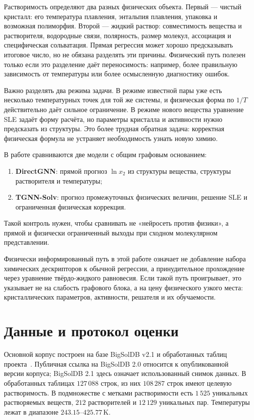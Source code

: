 \documentclass[11pt]{article}
\theoremstyle{definition}
\begin{document}
Растворимость определяют два разных физических объекта. Первый --- чистый кристалл: его температура плавления, энтальпия плавления, упаковка и возможная полиморфия. Второй --- жидкий раствор: совместимость вещества и растворителя, водородные связи, полярность, размер молекул, ассоциация и специфическая сольватация. Прямая регрессия может хорошо предсказывать итоговое число, но не обязана разделять эти причины. Физический путь полезен только если это разделение даёт переносимость: например, более правильную зависимость от температуры или более осмысленную диагностику ошибок.

Важно разделять два режима задачи. В режиме известной пары уже есть несколько температурных точек для той же системы, и физическая форма по $1/T$ действительно даёт сильное ограничение. В режиме нового вещества уравнение SLE задаёт форму расчёта, но параметры кристалла и активности нужно предсказать из структуры. Это более трудная обратная задача: корректная физическая формула не устраняет необходимость узнать новую химию.

В работе сравниваются две модели с общим графовым основанием:
\begin{enumerate}
    \item \textbf{DirectGNN}: прямой прогноз $\ln x_2$ из структуры вещества, структуры растворителя и температуры;
    \item \textbf{TGNN-Solv}: прогноз промежуточных физических величин, решение SLE и ограниченная физическая коррекция.
\end{enumerate}
Такой контроль нужен, чтобы сравнивать не «нейросеть против физики», а прямой и физически ограниченный выходы при сходном молекулярном представлении.

Физически информированный путь в этой работе означает не добавление набора химических дескрипторов к обычной регрессии, а принудительное прохождение через уравнение твёрдо-жидкого равновесия. Если такой путь проигрывает, это указывает не на слабость графового блока, а на цену физического узкого места: кристаллических параметров, активности, решателя и их обучаемости.

\section{Данные и протокол оценки}

Основной корпус построен на базе BigSolDB v2.1 и обработанных таблиц проекта~\cite{krasnov2025,bigsoldb2026}. Публичная ссылка на BigSolDB 2.0 относится к опубликованной версии корпуса; BigSolDB 2.1 здесь означает использованный снимок данных. В обработанных таблицах $127\,088$ строк, из них $108\,287$ строк имеют целевую растворимость. В подмножестве с метками растворимости есть $1\,525$ уникальных растворяемых веществ, $212$ растворителей и $12\,129$ уникальных пар. Температуры лежат в диапазоне $243.15$--$425.77\,\mathrm{K}$.
\end{document}
